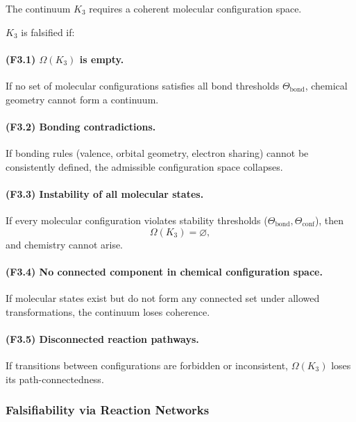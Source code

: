 The continuum $K_3$ requires a coherent molecular configuration space.

$K_3$ is falsified if:

\paragraph{(F3.1) \texorpdfstring{$\Omega(K_3)$}{\Omega(K_3)} is empty.}
If no set of molecular configurations satisfies all bond thresholds
$\Theta_{\mathrm{bond}}$, chemical geometry cannot form a continuum.

\paragraph{(F3.2) Bonding contradictions.}
If bonding rules (valence, orbital geometry, electron sharing) cannot be
consistently defined, the admissible configuration space collapses.

\paragraph{(F3.3) Instability of all molecular states.}
If every molecular configuration violates stability thresholds
($\Theta_{\mathrm{bond}}, \Theta_{\mathrm{conf}}$), then
\[
\Omega(K_3)=\varnothing,
\]
and chemistry cannot arise.

\paragraph{(F3.4) No connected component in chemical configuration
space.}
If molecular states exist but do not form any connected set under
allowed transformations, the continuum loses coherence.

\paragraph{(F3.5) Disconnected reaction pathways.}
If transitions between configurations are forbidden or inconsistent,
$\Omega(K_3)$ loses its path-connectedness.



\subsubsection{Falsifiability via Reaction Networks}

